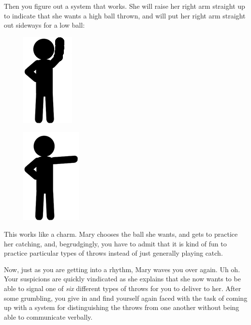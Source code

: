 \documentclass[UTF8]{book}
\begin{document}
\begin{CJK}{UTF8}{gbsn}
Then you figure out a system that works. She will raise her right arm straight up to indicate that she wants a high ball thrown, and will put her right arm straight out sideways for a low ball:

\begin{figure}[H]
\centering
\captionsetup{labelformat=empty}
\begin{minipage}{.4\textwidth}
  \centering
  \includegraphics[width=.3\linewidth]{stick-figure-arm-raised}
  \label{fig:test1}
\end{minipage}%
\begin{minipage}{.4\textwidth}
  \centering
  \includegraphics[width=.3\linewidth]{stick-figure-arm-sideways}
  \label{fig:test2}
\end{minipage}
\end{figure}

This works like a charm. Mary chooses the ball she wants, and gets to practice her catching, and, begrudgingly, you have to admit that it is kind of fun to practice particular types of throws instead of just generally playing catch.

Now, just as you are getting into a rhythm, Mary waves you over again. Uh oh. Your suspicions are quickly vindicated as she explains that she now wants to be able to signal one of \emph{six} different types of throws for you to deliver to her. After some grumbling, you give in and find yourself again faced with the task of coming up with a system for distinguishing the throws from one another without being able to communicate verbally.


\end{CJK}
\end{document}
